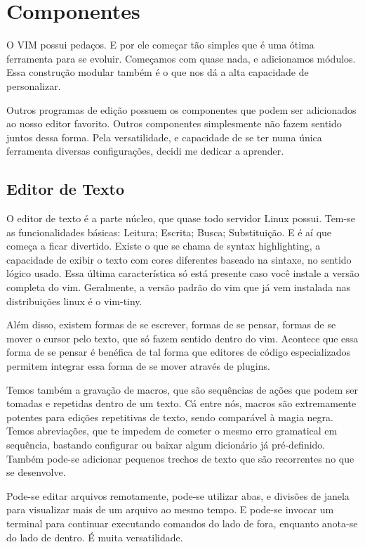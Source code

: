 \section{Componentes}
O VIM possui pedaços.
E por ele começar tão simples que é uma ótima ferramenta para se evoluir.
Começamos com quase nada, e adicionamos módulos.
Essa construção modular também é o que nos dá a alta capacidade de personalizar.

Outros programas de edição possuem os componentes que podem ser adicionados ao nosso editor favorito.
Outros componentes simplesmente não fazem sentido juntos dessa forma.
Pela versatilidade, e capacidade de se ter numa única ferramenta diversas configurações, decidi me dedicar a aprender.

\subsection{Editor de Texto}
O editor de texto é a parte núcleo, que quase todo servidor Linux possui.
Tem-se as funcionalidades básicas: Leitura; Escrita; Busca; Substituição.
E é aí que começa a ficar divertido.
Existe o que se chama de syntax highlighting, a capacidade de exibir o texto
com cores diferentes baseado na sintaxe, no sentido lógico usado.
Essa última característica só está presente caso você instale a versão completa do vim.
Geralmente, a versão padrão do vim que já vem instalada nas distribuições linux é o vim-tiny.


Além disso, existem formas de se escrever, formas de se pensar, formas de se
mover o cursor pelo texto, que só fazem sentido dentro do vim.
Acontece que essa forma de se pensar é benéfica de tal forma que
editores de código especializados permitem integrar essa forma de se mover através de plugins.

Temos também a gravação de macros, que são sequências de ações que podem ser
tomadas e repetidas dentro de um texto.
Cá entre nós, macros são extremamente potentes para edições repetitivas de texto,
sendo comparável à magia negra.
Temos abreviações, que te impedem de cometer o mesmo erro gramatical em sequência,
bastando configurar ou baixar algum dicionário já pré-definido.
Também pode-se adicionar pequenos trechos de texto que são recorrentes no que se desenvolve.

Pode-se editar arquivos remotamente, pode-se utilizar abas,
e divisões de janela para visualizar mais de um arquivo ao mesmo tempo.
E pode-se invocar um terminal para continuar executando comandos do lado de fora,
enquanto anota-se do lado de dentro.
É muita versatilidade.

